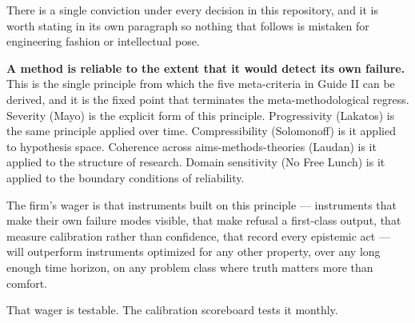 \documentclass[11pt,letterpaper]{article}
\begin{document}
There is a single conviction under every decision in this repository, and it is worth stating in its own paragraph so nothing that follows is mistaken for engineering fashion or intellectual pose.

\textbf{A method is reliable to the extent that it would detect its own failure.} This is the single principle from which the five meta-criteria in Guide II can be derived, and it is the fixed point that terminates the meta-methodological regress. Severity (Mayo) is the explicit form of this principle. Progressivity (Lakatos) is the same principle applied over time. Compressibility (Solomonoff) is it applied to hypothesis space. Coherence across aims-methods-theories (Laudan) is it applied to the structure of research. Domain sensitivity (No Free Lunch) is it applied to the boundary conditions of reliability.

The firm's wager is that instruments built on this principle --- instruments that make their own failure modes visible, that make refusal a first-class output, that measure calibration rather than confidence, that record every epistemic act --- will outperform instruments optimized for any other property, over any long enough time horizon, on any problem class where truth matters more than comfort.

That wager is testable. The calibration scoreboard tests it monthly.
\end{document}
